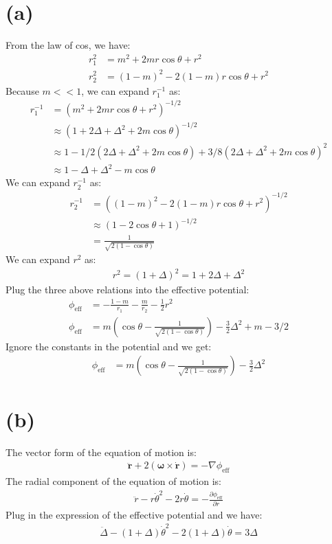 \documentclass[a4paper,12pt]{article}
\begin{document}
\section*{(a)}
From the law of cos, we have:
\begin{align*}
    r_1^2 &= m^2 + 2mr\cos \theta + r^2 \\
    r_2^2 &= (1-m)^2 - 2(1-m)r \cos \theta + r^2
\end{align*}
Because $m<<1$, we can expand $r_1^{-1}$ as:
\begin{align*}
    r_1^{-1} &= (m^2 + 2mr\cos \theta + r^2)^{-1/2} \\
            &\approx (1 + 2\Delta + \Delta^2 + 2m\cos \theta)^{-1/2} \\
            &\approx 1 - 1/2 (2\Delta + \Delta^2 + 2m\cos \theta) + 3/8 (2\Delta + \Delta^2 + 2m\cos \theta)^2 \\
            &\approx 1 - \Delta + \Delta^2 -m \cos \theta
\end{align*}
We can expand $r_2^{-1}$ as:
\begin{align*}
    r_2^{-1} &= ((1-m)^2 - 2(1-m)r \cos \theta + r^2)^{-1/2} \\
            &\approx (1 - 2 \cos \theta + 1)^{-1/2} \\
            &= \frac{1}{\sqrt{2(1- \cos \theta)}}
\end{align*}
We can expand $r^2$ as:
\begin{align*}
    r^2 = (1+\Delta)^2 = 1 + 2\Delta + \Delta^2
\end{align*}
Plug the three above relations into the effective potential:
\begin{align*}
    \phi_{\text{eff}} &= -\frac{1-m}{r_1} - \frac{m}{r_2} - \frac{1}{2}r^2 \\
    \phi_{\text{eff}} &= m(\cos \theta - \frac{1}{\sqrt{2(1- \cos \theta)}}) - \frac{3}{2}\Delta^2 +m - 3/2
\end{align*}
Ignore the constants in the potential and we get:
\begin{align*}
    \phi_{\text{eff}} &= m(\cos \theta - \frac{1}{\sqrt{2(1- \cos \theta)}}) - \frac{3}{2}\Delta^2
\end{align*}

\section*{(b)}
The vector form of the equation of motion is:
\begin{align*}
    \ddot{\boldsymbol{r}} + 2(\boldsymbol{\omega} \times \dot{\boldsymbol{r}}) = - \nabla \phi_{\text{eff}}
\end{align*}
The radial component of the equation of motion is:
\begin{align*}
    \ddot{r} - r\dot \theta^2 -2 r \dot{\theta}= - \frac{\partial \phi_{\text{eff}}}{\partial r}
\end{align*}
Plug in the expression of the effective potential and we have:
\begin{align*}
    \ddot{\Delta} - (1 + \Delta) \dot{\theta}^2 - 2(1 + \Delta)\dot{\theta} = 3\Delta
\end{align*}
\end{document}
